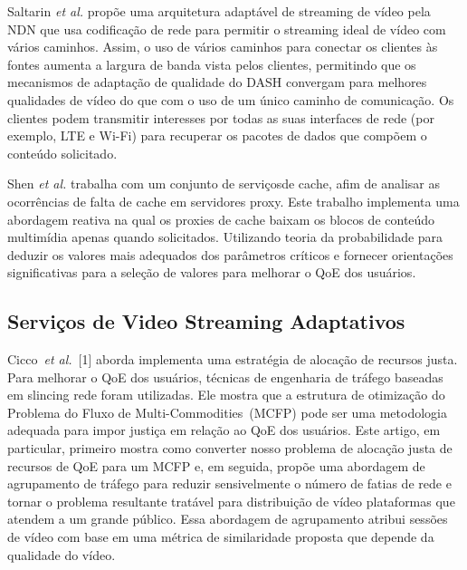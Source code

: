 Saltarin \textit{et al.} propõe uma arquitetura adaptável de streaming de vídeo pela NDN que usa codificação de rede para permitir o streaming ideal de vídeo com vários caminhos. Assim, o uso de vários caminhos para conectar os clientes às fontes aumenta a largura de banda vista pelos clientes, permitindo que os mecanismos de adaptação de qualidade do DASH convergam para melhores qualidades de vídeo do que com o uso de um único caminho de comunicação. Os clientes podem transmitir interesses por todas as suas interfaces de rede (por exemplo, LTE e Wi-Fi) para recuperar os pacotes de dados que compõem o conteúdo solicitado.

Shen \textit{et al.} trabalha com um conjunto de serviçosde cache, afim de analisar as ocorrências de falta de cache em servidores proxy. Este trabalho implementa uma abordagem reativa na qual os proxies de cache baixam os blocos de conteúdo multimídia apenas quando solicitados. Utilizando teoria da probabilidade para deduzir os valores mais adequados dos parâmetros críticos e fornecer orientações significativas para a seleção de valores para melhorar o QoE dos usuários.

\subsection{Serviços de Video Streaming Adaptativos}

Cicco~\textit{et al.}~[1] aborda implementa uma estratégia de alocação de recursos justa. Para melhorar o QoE dos usuários, técnicas de engenharia de tráfego baseadas em slincing rede foram utilizadas. Ele mostra que a estrutura de otimização do Problema do Fluxo de Multi-Commodities~(MCFP) pode ser uma metodologia adequada para impor justiça em relação ao QoE dos usuários. Este artigo, em particular, primeiro mostra como converter nosso problema de alocação justa de recursos de QoE para um MCFP e, em seguida, propõe uma abordagem de agrupamento de tráfego para reduzir sensivelmente o número de fatias de rede e tornar o problema resultante tratável para distribuição de vídeo plataformas que atendem a um grande público. Essa abordagem de agrupamento atribui sessões de vídeo com base em uma métrica de similaridade proposta que depende da qualidade do vídeo.

